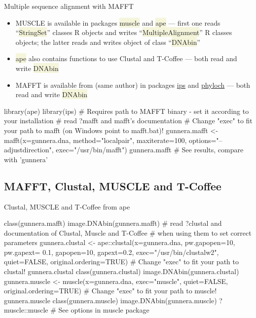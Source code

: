 \documentclass[compress, ucs, xelatex, 11pt, xcolor=svgnames, aspectratio=169,
	hyperref={
		bookmarks=true,
		unicode=true,
		colorlinks=true,
		pdftitle={Molecular data in R},
		plainpages=false,
		pdfauthor={Vojtech Zeisek},
		pdfsubject={Course about phylogeny and evolution in R},
		pdfcreator={XeLaTeX},
		pdfkeywords={R, evolution, phylogeny, molecular data},
		linkcolor=Crimson, %
		anchorcolor=Magenta, %
		citecolor=Magenta, %
		filecolor=Magenta, %
		menucolor=Magenta, %
		urlcolor=DodgerBlue, %
		pdftex},
	url={hyphens, lowtilde} %
	]{beamer}
\renewcommand{\texttt}[1]{\colorbox{Beige}{{\ttfamily #1}}}
\begin{document}
\begin{frame}[fragile]{Multiple sequence alignment with MAFFT}
	\begin{itemize}
		\item MUSCLE is available in packages \texttt{muscle} and \texttt{ape} --- first one reads \enquote{\texttt{*StringSet}} classes R objects and writes \enquote{\texttt{*MultipleAlignment}} R classes objects; the latter reads and writes object of class \enquote{\texttt{DNAbin}}
		\item \texttt{ape} also contains functions to use Clustal and T-Coffee --- both read and write \texttt{DNAbin}
		\item MAFFT is available from (same author) in packages \href{https://CRAN.R-project.org/package=ips}{ips} and \href{http://www.christophheibl.de/Rpackages.html}{phyloch} --- both read and write \texttt{DNAbin}
	\end{itemize}
	\begin{spluscode}
    library(ape)
    library(ips)
    # Requires path to MAFFT binary - set it according to your installation
    # read ?mafft and mafft's documentation
    # Change "exec" to fit your path to mafft (on Windows point to mafft.bat)!
    gunnera.mafft <- mafft(x=gunnera.dna, method="localpair", maxiterate=100,
      options="--adjustdirection", exec="/usr/bin/mafft")
    gunnera.mafft # See results, compare with 'gunnera'
	\end{spluscode}
\end{frame}

\subsection{MAFFT, Clustal, MUSCLE and T-Coffee}

\begin{frame}[fragile]{Clustal, MUSCLE and T-Coffee from ape}
	\begin{spluscode}
    class(gunnera.mafft)
    image.DNAbin(gunnera.mafft)
    # read ?clustal and documentation of Clustal, Muscle and T-Coffee
    # when using them to set correct parameters
    gunnera.clustal <- ape::clustal(x=gunnera.dna, pw.gapopen=10, pw.gapext=
      0.1, gapopen=10, gapext=0.2, exec="/usr/bin/clustalw2", quiet=FALSE,
      original.ordering=TRUE) # Change "exec" to fit your path to clustal!
    gunnera.clustal
    class(gunnera.clustal)
    image.DNAbin(gunnera.clustal)
    gunnera.muscle <- muscle(x=gunnera.dna, exec="muscle", quiet=FALSE,
      original.ordering=TRUE) # Change "exec" to fit your path to muscle!
    gunnera.muscle
    class(gunnera.muscle)
    image.DNAbin(gunnera.muscle)
    ?muscle::muscle # See options in muscle package
	\end{spluscode}
\end{frame}
\end{document}
